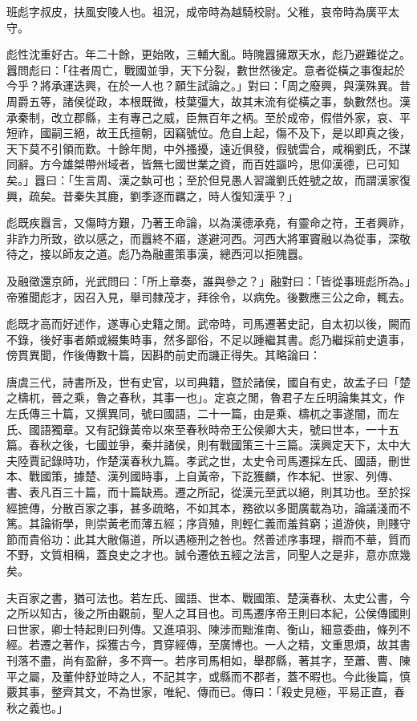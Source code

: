 
\begin{pinyinscope}
班彪字叔皮，扶風安陵人也。祖況，成帝時為越騎校尉。父稚，哀帝時為廣平太守。

彪性沈重好古。年二十餘，更始敗，三輔大亂。時隗囂擁眾天水，彪乃避難從之。囂問彪曰：「往者周亡，戰國並爭，天下分裂，數世然後定。意者從橫之事復起於今乎？將承運迭興，在於一人也？願生試論之。」對曰：「周之廢興，與漢殊異。昔周爵五等，諸侯從政，本根既微，枝葉彊大，故其末流有從橫之事，埶數然也。漢承秦制，改立郡縣，主有專己之威，臣無百年之柄。至於成帝，假借外家，哀、平短祚，國嗣三絕，故王氏擅朝，因竊號位。危自上起，傷不及下，是以即真之後，天下莫不引領而歎。十餘年閒，中外搔擾，遠近俱發，假號雲合，咸稱劉氏，不謀同辭。方今雄桀帶州域者，皆無七國世業之資，而百姓謳吟，思仰漢德，已可知矣。」囂曰：「生言周、漢之埶可也；至於但見愚人習識劉氏姓號之故，而謂漢家復興，疏矣。昔秦失其鹿，劉季逐而羈之，時人復知漢乎？」

彪既疾囂言，又傷時方艱，乃著王命論，以為漢德承堯，有靈命之符，王者興祚，非詐力所致，欲以感之，而囂終不寤，遂避河西。河西大將軍竇融以為從事，深敬待之，接以師友之道。彪乃為融畫策事漢，總西河以拒隗囂。

及融徵還京師，光武問曰：「所上章奏，誰與參之？」融對曰：「皆從事班彪所為。」帝雅聞彪才，因召入見，舉司隸茂才，拜徐令，以病免。後數應三公之命，輒去。

彪既才高而好述作，遂專心史籍之閒。武帝時，司馬遷著史記，自太初以後，闕而不錄，後好事者頗或綴集時事，然多鄙俗，不足以踵繼其書。彪乃繼採前史遺事，傍貫異聞，作後傳數十篇，因斟酌前史而譏正得失。其略論曰：

唐虞三代，詩書所及，世有史官，以司典籍，暨於諸侯，國自有史，故孟子曰「楚之檮杌，晉之乘，魯之春秋，其事一也」。定哀之閒，魯君子左丘明論集其文，作左氏傳三十篇，又撰異同，號曰國語，二十一篇，由是乘、檮杌之事遂闇，而左氏、國語獨章。又有記錄黃帝以來至春秋時帝王公侯卿大夫，號曰世本，一十五篇。春秋之後，七國並爭，秦并諸侯，則有戰國策三十三篇。漢興定天下，太中大夫陸賈記錄時功，作楚漢春秋九篇。孝武之世，太史令司馬遷採左氏、國語，刪世本、戰國策，據楚、漢列國時事，上自黃帝，下訖獲麟，作本紀、世家、列傳、書、表凡百三十篇，而十篇缺焉。遷之所記，從漢元至武以絕，則其功也。至於採經摭傳，分散百家之事，甚多疏略，不如其本，務欲以多聞廣載為功，論議淺而不篤。其論術學，則崇黃老而薄五經；序貨殖，則輕仁義而羞貧窮；道游俠，則賤守節而貴俗功：此其大敝傷道，所以遇極刑之咎也。然善述序事理，辯而不華，質而不野，文質相稱，蓋良史之才也。誠令遷依五經之法言，同聖人之是非，意亦庶幾矣。

夫百家之書，猶可法也。若左氏、國語、世本、戰國策、楚漢春秋、太史公書，今之所以知古，後之所由觀前，聖人之耳目也。司馬遷序帝王則曰本紀，公侯傳國則曰世家，卿士特起則曰列傳。又進項羽、陳涉而黜淮南、衡山，細意委曲，條列不經。若遷之著作，採獲古今，貫穿經傳，至廣博也。一人之精，文重思煩，故其書刊落不盡，尚有盈辭，多不齊一。若序司馬相如，舉郡縣，著其字，至蕭、曹、陳平之屬，及董仲舒並時之人，不記其字，或縣而不郡者，蓋不暇也。今此後篇，慎覈其事，整齊其文，不為世家，唯紀、傳而已。傳曰：「殺史見極，平易正直，春秋之義也。」


\end{pinyinscope}
